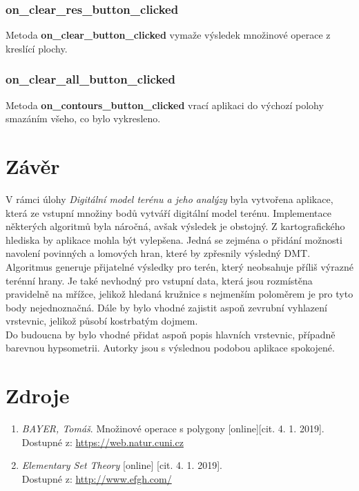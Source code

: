 \documentclass[a4paper, 12pt]{article}
\begin{document}
\subsubsection*{on\_clear\_res\_button\_clicked}
Metoda \textbf{on\_clear\_button\_clicked} vymaže výsledek množinové operace z kreslící plochy. 

\subsubsection*{on\_clear\_all\_button\_clicked}
Metoda \textbf{on\_contours\_button\_clicked} vrací aplikaci do výchozí polohy smazáním všeho, co bylo vykresleno. 



\clearpage
\section{Závěr}
V rámci úlohy \textit{Digitální model terénu a jeho analýzy} byla vytvořena aplikace, která ze vstupní množiny bodů vytváří digitální model terénu. Implementace některých algoritmů byla náročná, avšak výsledek je obstojný. Z kartografického hlediska by aplikace mohla být  vylepšena. Jedná se zejména o přidání možnosti navolení povinných a lomových hran, které by zpřesnily výsledný DMT. Algoritmus generuje přijatelné výsledky pro terén, který neobsahuje příliš výrazné terénní hrany. Je také nevhodný pro vstupní data, která jsou rozmístěna pravidelně na mřížce, jelikož hledaná kružnice s nejmenším poloměrem je pro tyto body nejednoznačná. Dále by bylo vhodné zajistit aspoň zevrubní vyhlazení vrstevnic, jelikož působí kostrbatým dojmem. \\

Do budoucna by bylo vhodné přidat aspoň popis hlavních vrstevnic, případně barevnou hypsometrii. Autorky jsou s výslednou podobou aplikace spokojené. 
\clearpage

\section{Zdroje}
\begin{enumerate}
\item  \textsl{BAYER, Tomáš}. Množinové operace s polygony [online][cit. 4. 1. 2019].\\
Dostupné z: \href{https://web.natur.cuni.cz/~bayertom/images/courses/Adk/adk9.pdf}{https://web.natur.cuni.cz}

\item  \textsl{Elementary Set Theory} [online] [cit. 4. 1. 2019].\\
Dostupné z: \href{http://www.efgh.com/math/algebra/sets.htm}{http://www.efgh.com/}
\end{enumerate}
\end{document}
